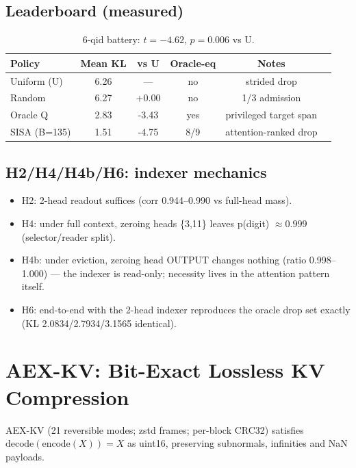 \documentclass[11pt]{article}
\newcommand{\sisa}{SISA}
\begin{document}
\subsection{Leaderboard (measured)}
\begin{table}[H]\centering\small
\begin{tabular}{lccccc}
\toprule
Policy & Mean KL & vs U & Oracle-eq & Notes \\
\midrule
Uniform (U) & 6.26 & --- & no & strided drop \\
Random & 6.27 & +0.00 & no & 1/3 admission \\
Oracle Q & 2.83 & -3.43 & yes & privileged target span \\
\sisa{} (B=135) & 1.51 & -4.75 & 8/9 & attention-ranked drop \\
\bottomrule
\end{tabular}
\caption{6-qid battery: $t=-4.62$, $p=0.006$ vs U.}
\end{table}

\subsection{H2/H4/H4b/H6: indexer mechanics}
\begin{itemize}
\item H2: 2-head readout suffices (corr 0.944--0.990 vs full-head mass).
\item H4: under full context, zeroing heads \{3,11\} leaves p(digit)
$\approx 0.999$ (selector/reader split).
\item H4b: under eviction, zeroing head OUTPUT changes nothing
(ratio 0.998--1.000) --- the indexer is read-only; necessity lives in the
attention pattern itself.
\item H6: end-to-end with the 2-head indexer reproduces the oracle drop set
exactly (KL 2.0834/2.7934/3.1565 identical).
\end{itemize}

\section{AEX-KV: Bit-Exact Lossless KV Compression}
\label{sec:aex}
AEX-KV (21 reversible modes; zstd frames; per-block CRC32) satisfies
$\mathrm{decode}(\mathrm{encode}(X)) = X$ as uint16, preserving subnormals,
infinities and NaN payloads.
\end{document}
